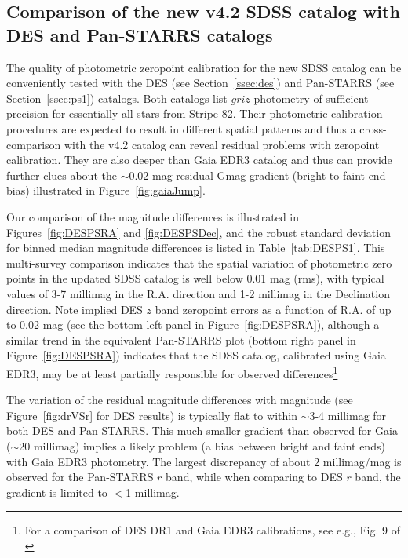 \documentclass[fleqn,usenatbib]{mnras}
\begin{document}
  

\subsection{Comparison of the new v4.2 SDSS catalog with DES and Pan-STARRS catalogs \label{sec:DESPS1}} 
  
The quality of photometric zeropoint calibration for the new SDSS catalog can be conveniently
tested with the DES (see Section~\ref{ssec:des}) and Pan-STARRS (see Section~\ref{ssec:ps1}) catalogs. 
Both catalogs list $griz$ photometry of sufficient precision for essentially all stars
from Stripe 82. Their photometric calibration procedures are expected to result in different 
spatial patterns and thus a cross-comparison with the v4.2 catalog can reveal residual problems
with zeropoint calibration. They are also deeper than Gaia EDR3 catalog and thus can provide
further clues about the $\sim$0.02 mag residual Gmag gradient (bright-to-faint end bias) 
illustrated in Figure~\ref{fig:gaiaJump}. 

Our comparison of the magnitude differences is illustrated in Figures~\ref{fig:DESPSRA} and \ref{fig:DESPSDec},
and the robust standard deviation for binned median magnitude differences is listed in Table~\ref{tab:DESPS1}. 
This multi-survey comparison indicates that the spatial variation of photometric zero points in the 
updated SDSS catalog is well below 0.01 mag (rms), with typical values of 3-7 millimag in the R.A. 
direction and 1-2 millimag in the Declination direction. Note implied DES $z$ band zeropoint errors 
as a function of R.A. of up to 0.02 mag (see the bottom left panel in Figure~\ref{fig:DESPSRA}), although a 
similar trend in the equivalent Pan-STARRS plot (bottom right panel in Figure~\ref{fig:DESPSRA}) indicates 
that the SDSS catalog, calibrated using Gaia EDR3, may be at least partially responsible for observed 
differences\footnote{For a comparison of DES DR1 and Gaia EDR3 calibrations, see e.g., Fig. 9 of \citet{2018ApJS..239...18A}}

The variation of the residual magnitude differences with magnitude (see Figure~\ref{fig:drVSr} for DES results) 
is typically flat to within $\sim$3-4 millimag for both DES and Pan-STARRS. This much smaller gradient than observed 
for Gaia ($\sim$20 millimag) implies a likely problem (a bias between bright and faint ends) with Gaia EDR3 
photometry. The largest discrepancy of about 2 millimag/mag is observed for the Pan-STARRS $r$ band, 
while when comparing to DES $r$ band, the gradient is limited to $<$1 millimag. 
\end{document}
